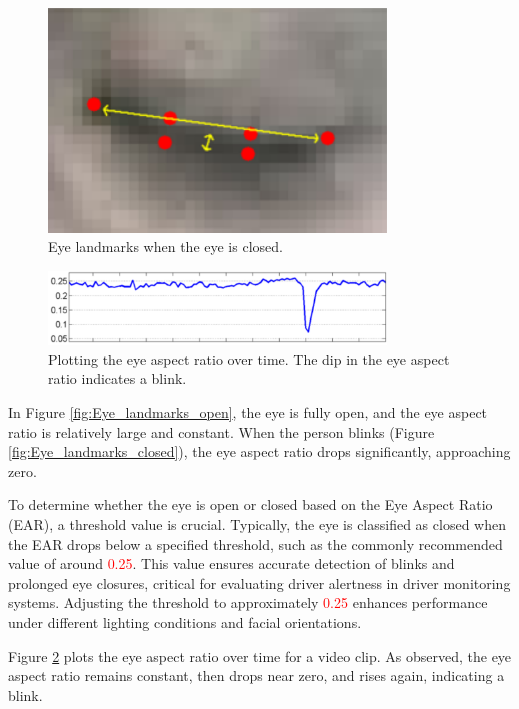 \begin{figure}[H]
    \centering
    \includegraphics[width=0.8\textwidth]{Images/1_AI/6points_closed_eye.png}
    \caption{Eye landmarks when the eye is closed.}
    \label{fig:6points_closed_eye}
\end{figure}

\begin{figure}[H]
    \centering
    \includegraphics[width=0.8\textwidth]{Images/1_AI/ear_over_time.png}
    \caption{Plotting the eye aspect ratio over time. The dip in the eye aspect ratio indicates a blink.}
    \label{fig:ear_over_time}
\end{figure}

In Figure \ref{fig:Eye_landmarks_open}, the eye is fully open, and the eye aspect ratio is relatively large and constant. When the person blinks (Figure \ref{fig:Eye_landmarks_closed}), the eye aspect ratio drops significantly, approaching zero.

To determine whether the eye is open or closed based on the Eye Aspect Ratio (EAR), a threshold value is crucial. Typically, the eye is classified as closed when the EAR drops below a specified threshold, such as the commonly recommended value of around \textcolor{red}{0.25}. This value ensures accurate detection of blinks and prolonged eye closures, critical for evaluating driver alertness in driver monitoring systems. Adjusting the threshold to approximately \textcolor{red}{0.25} enhances performance under different lighting conditions and facial orientations.

Figure \ref{fig:ear_over_time} plots the eye aspect ratio over time for a video clip. As observed, the eye aspect ratio remains constant, then drops near zero, and rises again, indicating a blink.

